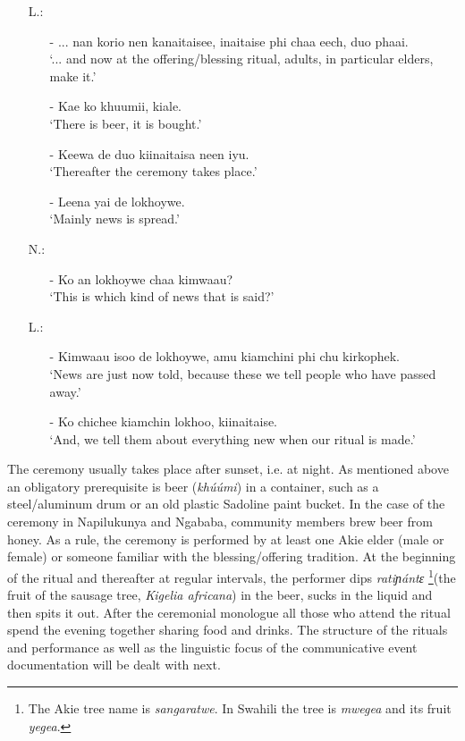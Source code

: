 \documentclass[output=paper,colorlinks,citecolor=brown]{langscibook}
\begin{document}
\begin{enumerate}
    \item[L.:]
    \begin{enumerate}
        \item[-]    ... nan korio nen kanaitaisee, inaitaise phi chaa eech, duo phaai.\\
                    `... and now at the offering/blessing ritual, adults, in particular elders, make it.'
        \item[-]    Kae ko khuumii, kiale.\\
                    `There is beer, it is bought.'
        \item[-]    Keewa de duo kiinaitaisa neen iyu.\\
                    `Thereafter the ceremony takes place.'
        \item[-]    Leena yai de lokhoywe.\\
                    `Mainly news is spread.'
    \end{enumerate}
    \item[N.:]
    \begin{enumerate}
        \item[-]    Ko an lokhoywe chaa kimwaau?\\
                    `This is which kind of news that is said?' 
    \end{enumerate}
    \item[L.:]
    \begin{enumerate}
        \item[-]    Kimwaau isoo de lokhoywe, amu kiamchini phi chu kirkophek. \\
                    `News are just now told, because these we tell people who have passed away.'
        \item[-]    Ko chichee kiamchin lokhoo, kiinaitaise. \\
                    `And, we tell them about everything new when our ritual is made.'
    \end{enumerate}
\end{enumerate}

The ceremony usually takes place after sunset, i.e. at night. As mentioned above an obligatory prerequisite is beer (\textit{khúúmi}) in a container, such as a steel/aluminum drum or an old plastic Sadoline paint bucket. In the case of the ceremony in Napilukunya and Ngababa, community members brew beer from honey. As a rule, the ceremony is performed by at least one Akie elder (male or female) or someone familiar with the blessing/offering tradition. At the beginning of the ritual and thereafter at regular intervals, the performer dips \textit{ratiɲántɛ }\footnote{The Akie tree name is \textit{sangaratwe}. In Swahili the tree is \textit{mwegea} and its fruit \textit{yegea}.}(the fruit of the sausage tree, \textit{Kigelia africana}) in the beer, sucks in the liquid and then spits it out. After the ceremonial monologue all those who attend the ritual spend the evening together sharing food and drinks. The structure of the rituals and performance as well as the linguistic focus of the communicative event documentation  will be dealt with next.
\end{document}
